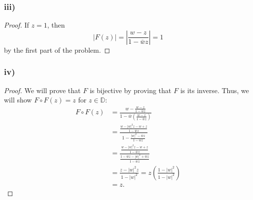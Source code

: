 \documentclass{article}
\begin{document}
\subsubsection*{iii)}
\begin{proof}
    If $ z= 1$, then 
    \[
        |F(z)| = \left|\frac{w - z}{1 - \bar{w}z} \right| = 1
    \]
    by the first part of the problem. 
\end{proof}

\subsubsection*{iv)}
\begin{proof}
    We will prove that $F$ is bijective by proving that $F$ is its inverse. Thus, we will show $F\circ F(z) = z$ for $z \in \mathbb{D}$:
    \begin{align*}
        F \circ F(z) &= \frac{w - \frac{w - z}{1 - \bar{w}z}}{1 - \bar{w}\left(\frac{w - z}{1 - \bar{w}z} \right)} \\
        &= \frac{\frac{w - |w|^2z - w + z}{1 - \bar{w}z}}{1 - \frac{|w|^2 - \bar{w}z}{1 - \bar{w}z}} \\
        &= \frac{\frac{w - |w|^2z - w + z}{1 - \bar{w}z}}{\frac{1 - \bar{w}z - |w|^2 + \bar{w}z}{1 - \bar{w}z}}\\
        &= \frac{z - |w|^2z}{1 - |w|^2} = z \left(\frac{1 - |w|^2}{1 - |w|^2} \right)  \\
        &= z.
    \end{align*}
\end{proof}
\end{document}
